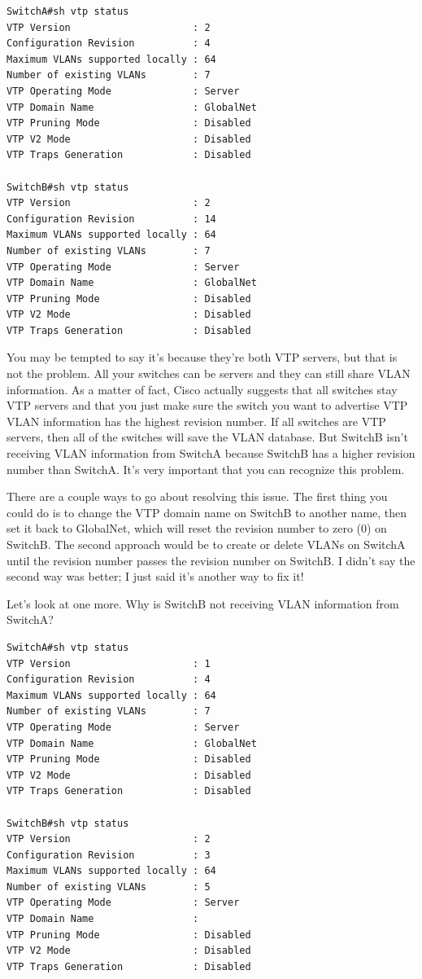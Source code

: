 \documentclass[b5paper,11pt]{memoir}
\begin{document}
\begin{verbatim}
SwitchA#sh vtp status
VTP Version                     : 2
Configuration Revision          : 4
Maximum VLANs supported locally : 64
Number of existing VLANs        : 7
VTP Operating Mode              : Server
VTP Domain Name                 : GlobalNet
VTP Pruning Mode                : Disabled
VTP V2 Mode                     : Disabled
VTP Traps Generation            : Disabled
 
SwitchB#sh vtp status
VTP Version                     : 2
Configuration Revision          : 14
Maximum VLANs supported locally : 64
Number of existing VLANs        : 7
VTP Operating Mode              : Server
VTP Domain Name                 : GlobalNet
VTP Pruning Mode                : Disabled
VTP V2 Mode                     : Disabled
VTP Traps Generation            : Disabled
\end{verbatim}

You may be tempted to say it's because they're both VTP servers, but
that is not the problem. All your switches can be servers and they can
still share VLAN information. As a matter of fact, Cisco actually
suggests that all switches stay VTP servers and that you just make sure
the switch you want
to advertise VTP VLAN information has the highest revision number. If
all switches are VTP servers, then all of the switches will save the
VLAN database. But SwitchB isn't receiving VLAN information from SwitchA
because SwitchB has a higher revision number than SwitchA. It's very
important that you can recognize this problem.

There are a couple ways to go about resolving this issue. The first
thing you could do is to change the VTP domain name on SwitchB to
another name, then set it back to GlobalNet, which will reset the
revision number to zero (0) on SwitchB. The second approach would be to
create or delete VLANs on SwitchA until the revision number passes the
revision number on SwitchB. I didn't say the second way was better; I
just said it's another way to fix it!

Let's look at one more. Why is SwitchB not receiving VLAN information
from SwitchA?

\begin{verbatim}
SwitchA#sh vtp status
VTP Version                     : 1
Configuration Revision          : 4
Maximum VLANs supported locally : 64
Number of existing VLANs        : 7
VTP Operating Mode              : Server
VTP Domain Name                 : GlobalNet
VTP Pruning Mode                : Disabled
VTP V2 Mode                     : Disabled
VTP Traps Generation            : Disabled
 
SwitchB#sh vtp status
VTP Version                     : 2
Configuration Revision          : 3
Maximum VLANs supported locally : 64
Number of existing VLANs        : 5
VTP Operating Mode              : Server
VTP Domain Name                 :
VTP Pruning Mode                : Disabled
VTP V2 Mode                     : Disabled
VTP Traps Generation            : Disabled
\end{verbatim}
\end{document}

